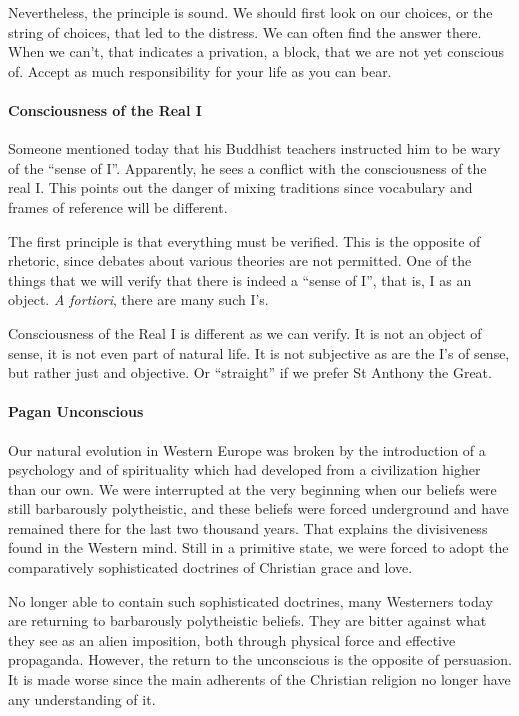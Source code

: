 Nevertheless, the principle is sound. We should first look on our choices, or the string of choices, that led to the distress. We can often find the answer there. When we can't, that indicates a privation, a block, that we are not yet conscious of. Accept as much responsibility for your life as you can bear.

\paragraph{Consciousness of the Real I}


Someone mentioned today that his Buddhist teachers instructed him to be wary of the ``sense of I''. Apparently, he sees a conflict with the consciousness of the real I. This points out the danger of mixing traditions since vocabulary and frames of reference will be different.

The first principle is that everything must be verified. This is the opposite of rhetoric, since debates about various theories are not permitted. One of the things that we will verify that there is indeed a ``sense of I'', that is, I as an object. \emph{A fortiori}, there are many such I's.

Consciousness of the Real I is different as we can verify. It is not an object of sense, it is not even part of natural life. It is not subjective as are the I's of sense, but rather just and objective. Or ``straight'' if we prefer St Anthony the Great.

\paragraph{Pagan Unconscious}


\begin{quotex}
Our natural evolution in Western Europe was broken by the introduction of a psychology and of spirituality which had developed from a civilization higher than our own. We were interrupted at the very beginning when our beliefs were still barbarously polytheistic, and these beliefs were forced underground and have remained there for the last two thousand years. That explains the divisiveness found in the Western mind. Still in a primitive state, we were forced to adopt the comparatively sophisticated doctrines of Christian grace and love.
\end{quotex}


No longer able to contain such sophisticated doctrines, many Westerners today are returning to barbarously polytheistic beliefs. They are bitter against what they see as an alien imposition, both through physical force and effective propaganda. However, the return to the unconscious is the opposite of persuasion. It is made worse since the main adherents of the Christian religion no longer have any understanding of it.


